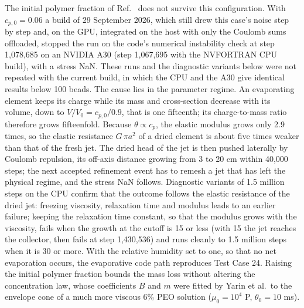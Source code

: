 The initial polymer fraction of Ref.~\cite{yarin2001bending} does not survive
this configuration.  With $c_{p,0}=0.06$ a build of 29 September 2026,
which still drew this case's noise step by step and, on the GPU, integrated
on the host with only the Coulomb sums offloaded, stopped the run on the
code's numerical instability check at step 1,078,685 on an NVIDIA A30 (step
1,067,695 with the NVFORTRAN CPU build), with a stress NaN.  These runs and
the diagnostic variants below were not repeated with the current build, in
which the CPU and the A30 give identical results below 100 beads.  The cause
lies in the parameter regime.  An evaporating element keeps its charge while its
mass and cross-section decrease with its volume, down to $V/V_0=c_{p,0}/0.9$,
that is one fifteenth; its charge-to-mass ratio therefore grows fifteenfold.
Because $\theta\propto c_p$, the elastic modulus grows only 2.9 times, so the
elastic resistance $G\,\pi a^2$ of a dried element is about five times weaker
than that of the fresh jet.  The dried head of the jet is then pushed
laterally by Coulomb repulsion, its off-axis distance growing from 3 to 20 cm
within 40,000 steps; the next accepted refinement event has to remesh a jet
that has left the physical regime, and the stress NaN follows.  Diagnostic
variants of 1.5 million steps on the CPU confirm that the outcome follows the
elastic resistance of the dried jet: freezing viscosity, relaxation time and
modulus leads to an earlier failure; keeping the relaxation time constant,
so that the modulus grows with the viscosity, fails when the growth at the
cutoff is 15 or less (with 15 the jet reaches the collector, then fails at
step 1,430,536) and runs cleanly to 1.5 million steps when it is 30 or
more.  With the relative humidity set to one, so that no net evaporation
occurs, the evaporative code path reproduces Test Case 24.  Raising the initial polymer fraction bounds the mass loss without
altering the concentration law, whose coefficients $B$ and $m$ were fitted by
Yarin et al.\ to the envelope cone of a much more viscous 6\% PEO solution
($\mu_0=10^{4}$ P, $\theta_0=10$ ms).

